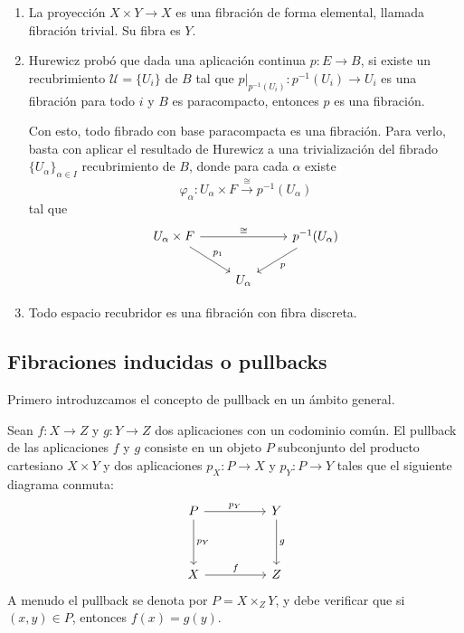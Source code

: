 \begin{ejems}
\begin{enumerate}
\item La proyección $X \times Y \longrightarrow X$ es una fibración de forma elemental, llamada fibración trivial. Su fibra es $Y$.
\item Hurewicz probó que dada una aplicación continua $p: E \longrightarrow B$, si existe un recubrimiento $\mathcal{U} = \{U_i\}$ de $B$ tal que $p \vert_{p^{-1}(U_i)} : p^{-1}(U_i) \longrightarrow U_i$ es una fibración para todo $i$ y $B$ es paracompacto, entonces $p$ es una fibración. \par
Con esto, todo fibrado con base paracompacta es una fibración. Para verlo, basta con aplicar el resultado de Hurewicz a una trivialización del fibrado $\{ U_\alpha \}_{\alpha \in I}$ recubrimiento de $B$, donde para cada $\alpha$ existe 
\[
\varphi_\alpha : U_\alpha \times F \stackrel{\cong}{\longrightarrow} p^{-1}(U_\alpha)
\]
tal que
\[
\begin{tikzcd}
U_\alpha \times F \arrow{rr}{\cong} \arrow{dr}{p_1} & & p^{-1}(U_\alpha) \arrow{ld}{p} \\
& U_\alpha &
\end{tikzcd}
\]

\item Todo espacio recubridor es una fibración con fibra discreta.
\end{enumerate}
\end{ejems}

\newpage 
\subsection{Fibraciones inducidas o pullbacks}
Primero introduzcamos el concepto de pullback en un ámbito general. 
\begin{defin}
Sean $f : X \longrightarrow Z$ y $g: Y \longrightarrow Z$ dos aplicaciones con un codominio común. El pullback de las aplicaciones $f$ y $g$ consiste en un objeto $P$  subconjunto del producto cartesiano $X \times Y$ y dos aplicaciones $p_X : P \longrightarrow X$ y $p_Y : P \longrightarrow Y$ tales que el siguiente diagrama conmuta:
\[
\begin{tikzcd}
P \arrow{rr}{p_Y} \arrow{dd}{p_Y} && Y \arrow{dd}{g} \\
\\
X \arrow{rr}{f} && Z
\end{tikzcd}
\]
A menudo el pullback se denota por $P = X \times_Z Y$, y debe verificar que si $(x, y) \in P$, entonces $f(x) = g(y)$.
\end{defin}

